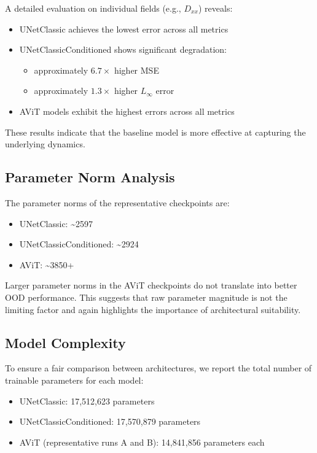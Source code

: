 \documentclass[
]{article}
\providecommand{\tightlist}{%
  \setlength{\itemsep}{0pt}\setlength{\parskip}{0pt}}
\begin{document}
A detailed evaluation on individual fields (e.g., \(D_{xx}\)) reveals:

\begin{itemize}
\tightlist
\item
  UNetClassic achieves the lowest error across all metrics
\item
  UNetClassicConditioned shows significant degradation:

  \begin{itemize}
  \tightlist
  \item
    approximately \(6.7\times\) higher MSE
  \item
    approximately \(1.3\times\) higher \(L_\infty\) error
  \end{itemize}
\item
  AViT models exhibit the highest errors across all metrics
\end{itemize}

These results indicate that the baseline model is more effective at
capturing the underlying dynamics.

\subsection{Parameter Norm Analysis}\label{parameter-norm-analysis}

The parameter norms of the representative checkpoints are:

\begin{itemize}
\tightlist
\item
  UNetClassic: \textasciitilde2597
\item
  UNetClassicConditioned: \textasciitilde2924
\item
  AViT: \textasciitilde3850+
\end{itemize}

Larger parameter norms in the AViT checkpoints do not translate into
better OOD performance. This suggests that raw parameter magnitude is
not the limiting factor and again highlights the importance of
architectural suitability.

\subsection{Model Complexity}

To ensure a fair comparison between architectures, we report the total
number of trainable parameters for each model:

\begin{itemize}
    \item UNetClassic: 17,512,623 parameters
    \item UNetClassicConditioned: 17,570,879 parameters
    \item AViT (representative runs A and B): 14,841,856 parameters each
\end{itemize}
\end{document}
